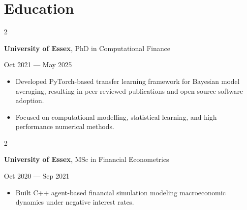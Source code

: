 \documentclass[6pt, letterpaper]{article}
\newenvironment{highlights}{
    \begin{itemize}[
        topsep=0.03 cm,
        parsep=0.03 cm,
        partopsep=0pt,
        itemsep=0pt,
        leftmargin=0 cm + 10pt
    ]
}{
    \end{itemize}
} %
\newenvironment{twocolentry}[2][]{
    \onecolentry
    \def\secondColumn{#2}
    \setcolumnwidth{\fill, 4.5 cm}
    \begin{paracol}{2}
}{
    \switchcolumn \raggedleft \secondColumn
    \end{paracol}
    \endonecolentry
} %
\begin{document}
    \section{Education}

            \begin{twocolentry}{
                Oct 2021 --- May 2025
            }
            \textbf{University of Essex}, PhD in Computational Finance
            \end{twocolentry}

            \begin{highlights}

                \item Developed PyTorch-based transfer learning framework for Bayesian model averaging, resulting in peer-reviewed publications and open-source software adoption.
                \item Focused on computational modelling, statistical learning, and high-performance numerical methods.

            \end{highlights}

            \begin{twocolentry}{
                Oct 2020 --- Sep 2021
            }
            \textbf{University of Essex}, MSc in Financial Econometrics
            \end{twocolentry}

            \begin{highlights}
            \item Built C++ agent-based financial simulation modeling macroeconomic dynamics under negative interest rates.
            \end{highlights}
\end{document}
